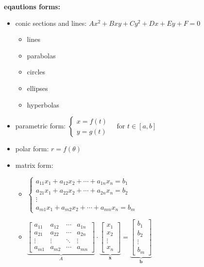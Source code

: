 \documentclass{article}
\begin{document}
\textbf{eqautions forms:}
	\begin{itemize}
		\item conic sections and lines: $Ax^2 + Bxy + Cy^2 + Dx + Ey + F = 0$
			\begin{itemize}
				\item lines
				\item parabolas
				\item circles
				\item ellipses
				\item hyperbolas
			\end{itemize}
		\item parametric form: $\begin{cases} x = f(t) \\ y = g(t) \end{cases} \quad \text{for } t \in [a, b]$ 
		\item polar form: $r = f(\theta)$
		\item matrix form:

			\begin{itemize}
				\item $\begin{cases} a_{11} x_1 + a_{12} x_2 + \cdots + a_{1n} x_n = b_1 \\ a_{21} x_1 + a_{22} x_2 + \cdots + a_{2n} x_n = b_2 \\ \vdots \\ a_{m1} x_1 + a_{m2} x_2 + \cdots + a_{mn} x_n = b_m \end{cases}$ 
				\item $ \underbrace{\begin{bmatrix} a_{11} & a_{12} & \cdots & a_{1n} \\ a_{21} & a_{22} & \cdots & a_{2n} \\ \vdots & \vdots & \ddots & \vdots \\ a_{m1} & a_{m2} & \cdots & a_{mn}\end{bmatrix} }_{A} \cdot \underbrace{ \begin{bmatrix} x_1 \\ x_2 \\ \vdots \\ x_n \end{bmatrix} }_{\mathbf{x}} = \underbrace{ \begin{bmatrix} b_1 \\ b_2 \\ \vdots \\ b_m \end{bmatrix} }_{\mathbf{b}}$
			\end{itemize}
	\end{itemize}
\end{document}

